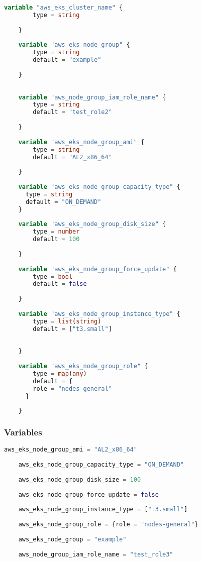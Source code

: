 \begin{lstlisting}[language=terraform]
    variable "aws_eks_cluster_name" {
        type = string
      
    }
    
    variable "aws_eks_node_group" {
        type = string
        default = "example"
      
    }
    
    
    variable "aws_node_group_iam_role_name" {
        type = string
        default = "test_role2"
      
    }
    
    variable "aws_eks_node_group_ami" {
        type = string
        default = "AL2_x86_64"
      
    }
    
    variable "aws_eks_node_group_capacity_type" {
      type = string
      default = "ON_DEMAND"
    }
    
    variable "aws_eks_node_group_disk_size" {
        type = number
        default = 100
      
    }
    
    variable "aws_eks_node_group_force_update" {
        type = bool
        default = false
      
    }
    
    variable "aws_eks_node_group_instance_type" {
        type = list(string)
        default = ["t3.small"]
    
      
    }
    
    variable "aws_eks_node_group_role" {
        type = map(any)
        default = {
        role = "nodes-general"
      }
      
    }
\end{lstlisting}

\subsubsection{
{Variables}}

\begin{lstlisting}[language=terraform]
    aws_eks_node_group_ami = "AL2_x86_64"
  
    aws_eks_node_group_capacity_type = "ON_DEMAND"
    
    aws_eks_node_group_disk_size = 100
      
    aws_eks_node_group_force_update = false
      
    aws_eks_node_group_instance_type = ["t3.small"]
    
    aws_eks_node_group_role = {role = "nodes-general"}
    
    aws_eks_node_group = "example"
    
    aws_node_group_iam_role_name = "test_role3"
\end{lstlisting}

